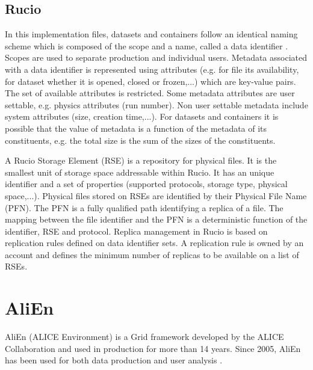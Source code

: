 \subsection{Rucio}
In this implementation files, datasets and containers follow an identical naming scheme which is composed of the
scope and a name, called a data identifier \cite{ATLAS-Rucio}. Scopes are used to separate production and individual
users. Metadata associated with a data identifier is represented using attributes (e.g. for file its availability,
for dataset whether it is opened, closed or frozen,...) which are key-value pairs. The set of available attributes 
is restricted. Some metadata attributes are user settable, e.g. physics attributes (run number). Non user settable 
metadata include system attributes (size, creation time,...). For datasets and containers it is possible that the 
value of metadata is a function of the metadata of its constituents, e.g. the total size is the sum of the
sizes of the constituents.

A Rucio Storage Element (RSE) is a repository for physical files. It is the smallest unit of
storage space addressable within Rucio. It has an unique identifier and a set of properties (supported protocols,
storage type, physical space,...). Physical files stored on RSEs are identified by their Physical File Name (PFN).
The PFN is a fully qualified path identifying a replica of a file. The mapping between the file identifier and
the PFN is a deterministic function of the identifier, RSE and protocol. Replica management in Rucio is based on
replication rules defined on data identifier sets. A replication rule is owned by an account and defines the 
minimum number of replicas to be available on a list of RSEs.

\section{AliEn}

AliEn (ALICE Environment) is a Grid framework developed by the ALICE
Collaboration and used in production for more than 14 years. Since 2005, AliEn
has been used for both data production and user analysis  \cite{AliEn2}. 

